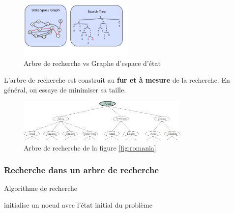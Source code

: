 \begin{figure}[H]
    \begin{center}
        \includegraphics[width=0.5\textwidth]{pictures/st_vs_sg.png}
    \end{center}
    \caption{Arbre de recherche vs Graphe d'espace d'état}\label{fig:stvssg}
\end{figure}


\begin{note}
    L'arbre de recherche est construit au \textbf{fur et à mesure} de la recherche. 
    En général, on essaye de  minimiser sa taille.
\end{note}



\begin{figure}[H]
    \begin{center}
        \includegraphics[width=0.75\textwidth]{pictures/romst.png}
    \end{center}
    \caption{Arbre de recherche de la figure \ref{fig:romania}}\label{fig:romst}
\end{figure}

\subsubsection{Recherche dans un arbre de recherche} %
\label{sec:recherche_dans_un_arbre_de_recherche}

\begin{algorithm}[H]
    \caption{Algorithme de recherche}\label{alg:stsearch}
    \begin{algorithmic}
        \State initialise un noeud avec l'état initial du problème

        \EndLoop
        \EndFunction
    \end{algorithmic}
\end{algorithm}

